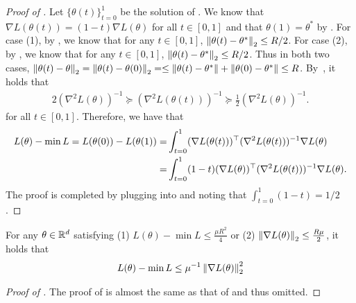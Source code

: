 \begin{proof}[Proof of ]

Let $\{\theta(t)\}_{t=0}^1$ be the solution of .
We know that $\nabla L(\theta(t)) = (1-t)\nabla L(\theta)$ for all $t\in[0,1]$  and that $\theta(1) = \theta^*$  by .
 For case (1), by , we know that for any $t\in[0,1]$, $\left\|\theta(t)-\theta^*\right\|_2\le R/2$. 
 For case (2), by , we know that for any $t\in[0,1]$, $\left\|\theta(t)-\theta^*\right\|_2\le R/2$. Thus in both two cases, $\left\|\theta(t)-\theta\right\|_2=\left\|\theta(t)-\theta(0)\right\|_2=\le \left\|\theta(t)-\theta^*\right\| + \left\|\theta(0)-\theta^*\right\|\le R$. By~, it holds that 
\begin{align}\label{eq:small_loss_hessian_sanwidch}
	2(\nabla^2 L(\theta))^{-1} \succeq (\nabla^2 L(\theta(t)))^{-1}\succeq \frac{1}{2}(\nabla^2 L(\theta))^{-1}.
\end{align}
for all $t\in[0,1]$. Therefore, we have that 
\begin{align}\label{eq:small_loss_loss_integral}
L(\theta) - \min L = L(\theta(0))-L(\theta(1)) 
=&\int_{t=0}^1  	(\nabla L(\theta(t)))^\top (\nabla^2 L(\theta(t)))^{-1} \nabla L(\theta)\notag\\
=&\int_{t=0}^1 	(1-t)	(\nabla L(\theta))^\top (\nabla^2 L(\theta(t)))^{-1} \nabla L(\theta).
\end{align}
The proof is completed by plugging  into  and noting that $\int_{t=0}^1(1-t) = 1/2$.
\end{proof}

\begin{lemma}\label{lem:small_loss_or_gradient_imply_PL}
For any $\theta\in\mathbb{R}^d$ satisfying (1) $L(\theta)-\min L\le \frac{\mu R^2}{4}$ or (2) $\left\|\nabla L (\theta)\right\|_2 \le \frac{R\mu}{2}$, it holds that \begin{align}
L(\theta) - \min L	\le \mu^{-1}\left\|\nabla L(\theta)\right\|_2^2  \end{align}
\end{lemma}
\begin{proof}[Proof of ]
	The proof of  is almost the same as that of  and thus omitted.
\end{proof}


